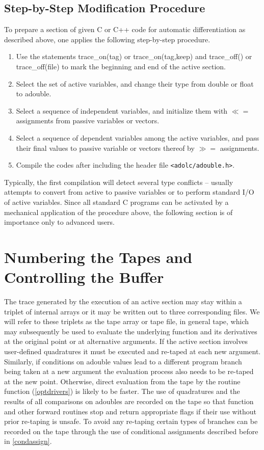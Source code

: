 \documentclass[11pt,twoside]{article}
\begin{document}
\subsection{Step-by-Step Modification Procedure}
%
To prepare a section of given C or C++ code for automatic
differentiation as described above, one applies the following step-by-step procedure.
\begin{enumerate}
\item
Use the statements {\sf trace\_on(tag)} or {\sf trace\_on(tag,keep)}
and {\sf trace\_off()} or {\sf trace\_off(file)} to mark the
beginning and end of the active section. 
\item 
Select the set of active variables, and change their type from
{\sf double} or {\sf float} to {\sf adouble}.
\item
Select a sequence of independent variables, and initialize them with
\boldmath $\ll=$ \unboldmath assignments from passive variables or vectors.
\item
Select a sequence of dependent variables among the active variables,
and pass their final values to passive variable or vectors thereof
by \boldmath $\gg=$ \unboldmath assignments.
\item 
Compile the codes after including the header file \verb=<adolc/adouble.h>=. 
\end{enumerate}
Typically, the first compilation will detect several type conflicts
-- usually attempts to convert from active to passive
variables or to perform standard I/O of active variables.
Since all standard
C programs can be activated by a mechanical application of the
procedure above, the following section is of importance
only to advanced users. 
%                                                                  
\section{Numbering the Tapes and Controlling the Buffer}
\label{tape}
%
The trace generated by the execution of an active section may stay
within a triplet of internal arrays or it may be written out
to three corresponding files. We will refer to these triplets as the 
tape array or tape file, in general tape, which may subsequently be
used to evaluate the 
underlying function and its derivatives at the original point or at 
alternative arguments. If the active section involves user-defined
quadratures it must be executed and
re-taped at each new argument. Similarly, if conditions on
{\sf adouble} values lead to a different program branch being taken at 
a new argument the evaluation process also needs to be re-taped at the 
new point. Otherwise, direct evaluation from
the tape by the routine {\sf function} (\autoref{optdrivers}) is 
likely to be
faster. The use of quadratures and the results of all comparisons on
{\sf adouble}s are recorded on the tape so that {\sf function} and other
forward routines stop and  return appropriate flags if their use without
prior re-taping is unsafe. To avoid any re-taping certain types of
branches can be recorded on the tape through
the use of conditional assignments  
described before in \autoref{condassign}. 
\end{document}
